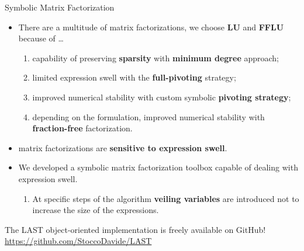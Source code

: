 \begin{frame}{Symbolic Matrix Factorization}
  \begin{itemize}
    \item There are a multitude of matrix factorizations, we choose \textbf{\ac{LU}} and \textbf{\ac{FFLU}} because of \dots
    \begin{enumerate}
      \item capability of preserving \textbf{sparsity} with \textbf{minimum degree} approach;
      \item limited expression swell with the \textbf{full-pivoting} strategy;
      \item improved numerical stability with custom symbolic \textbf{pivoting strategy};
      \item depending on the formulation, improved numerical stability with \textbf{fraction-free} factorization.
    \end{enumerate}
    \item \Maple{} matrix factorizations are \textbf{sensitive to expression swell}.
    \item We developed a symbolic matrix factorization toolbox capable of dealing with expression swell.
    \begin{enumerate}
      \item At specific steps of the algorithm \textbf{veiling variables} are introduced not to increase the size of the expressions.
    \end{enumerate}
\end{itemize}
  \begin{bbox}
  The LAST object-oriented implementation is freely available on GitHub! \\
  \centering \url{https://github.com/StoccoDavide/LAST}
\end{bbox}
\end{frame}

